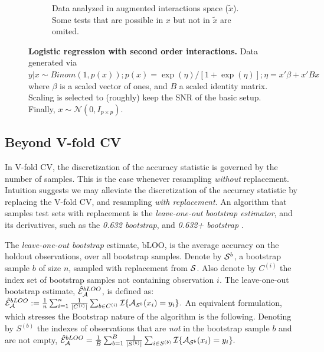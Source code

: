 \documentclass[]{bio}
\begin{document}
\begin{figure}[th]
\begin{subfigure}[t]{.45\columnwidth}
		\caption{Data analyzed in augmented interactions space ($\tilde x$).
		Some tests that are possible in $x$ but not in $\tilde{x}$ are omited.}
		\label{fig:interactions-in-augmented-space}
	\end{subfigure}
	\caption{\textbf{Logistic regression with second order interactions.} 
		Data generated via $y|x \sim Binom(1,p(x));
		p(x)=\exp(\eta)/[1+\exp(\eta)];
		\eta=x'\beta+x'Bx$ where 
		$\beta$ is a scaled vector of ones, and $B$ a scaled identity matrix.
		Scaling is selected to (roughly) keep the SNR of the basic setup. 
		Finally, $x\sim \mathcal{N}(0,I_{p\times p})$.
	 } 
	\label{fig:logistic-main-and-interactions}
\end{figure}





\subsection{Beyond V-fold CV}
\label{sec:bootstrap}

In V-fold CV, the discretization of the accuracy statistic is governed by the number of samples. 
This is the case whenever resampling \emph{without} replacement. 
Intuition suggests we may alleviate the discretization of the accuracy statistic by replacing the V-fold CV, and resampling \emph{with replacement}.
An algorithm that samples test sets with replacement is the \emph{leave-one-out bootstrap estimator},  and its derivatives, such as the \emph{0.632 bootstrap}, and \emph{0.632+ bootstrap} \citep[Sec 7.11]{hastie_elements_2003}.
\begin{definition}[bLOO]
	\label{def:bloo}
	The \emph{leave-one-out bootstrap} estimate, bLOO, is the average accuracy on the holdout observations, over all bootstrap samples. 
	Denote by $\mathcal{S}^b$, a bootstrap sample $b$ of size $n$, sampled with replacement from $\mathcal{S}$. 
	Also denote by $C^{(i)}$ the index set of bootstrap samples not containing observation $i$.
	The leave-one-out bootstrap estimate, $\hat{\mathcal{E}}_{\mathcal{A}}^{bLOO}$,  is defined as:
	$\hat{\mathcal{E}}_{\mathcal{A}}^{bLOO}:= \frac 1n \sum_{i=1}^{n} \frac{1}{|C^{(i)}|} \sum_{b \in C^{(i)}} \mathcal{I}{\{ \mathcal{A}_{\mathcal{S}^b}(x_i)=y_i \}}.$
	An equivalent formulation, which stresses the Bootstrap nature of the algorithm is the following. 
	Denoting by $S^{(b)}$ the indexes of observations that are \emph{not} in the bootstrap sample $b$ and are not empty, 
	$\hat{\mathcal{E}}_{\mathcal{A}}^{bLOO} = \frac 1B \sum_{b=1}^{B} \frac{1}{|S^{(b)}|} \sum_{i \in S^{(b)}} \mathcal{I}{\{ \mathcal{A}_{\mathcal{S}^b}(x_i)=y_i \}}.$
\end{definition}
\end{document}
